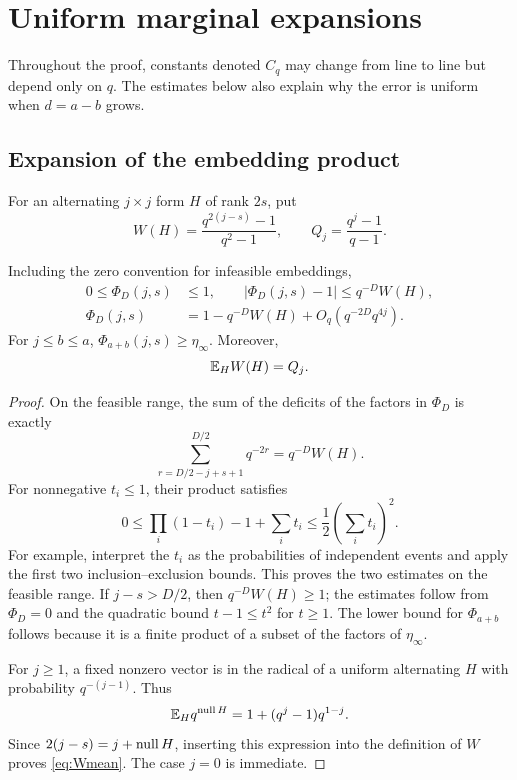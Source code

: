 \section{Uniform marginal expansions}\label{sec:marginal-proof}

Throughout the proof, constants denoted \(C_q\) may change from line to
line but depend only on \(q\). The estimates below also explain why
the error is uniform when \(d=a-b\) grows.

\subsection{Expansion of the embedding product}

For an alternating \(j\times j\) form \(H\) of rank \(2s\), put
\[
 W(H)=\frac{q^{2(j-s)}-1}{q^2-1},
 \qquad Q_j=\frac{q^j-1}{q-1}.
\]

\begin{lemma}\label{lem:products}
Including the zero convention for infeasible embeddings,
\begin{align}
 0\le\Phi_D(j,s)&\le1,\qquad
 |\Phi_D(j,s)-1|\le q^{-D}W(H),\label{eq:product-first}\\
 \Phi_D(j,s)
   &=1-q^{-D}W(H)+O_q(q^{-2D}q^{4j}).\label{eq:product-second}
\end{align}
For \(j\le b\le a\), \(\Phi_{a+b}(j,s)\ge\eta_\infty\).
Moreover,
\begin{equation}\label{eq:Wmean}
 \mathbb E_HW(H)=Q_j.
\end{equation}
\end{lemma}

\begin{proof}
On the feasible range, the sum of the deficits of the factors in
\(\Phi_D\) is exactly
\[
 \sum_{r=D/2-j+s+1}^{D/2}q^{-2r}=q^{-D}W(H).
\]
For nonnegative \(t_i\le1\), their product satisfies
\[
 0\le \prod_i(1-t_i)-1+\sum_i t_i
       \le\frac12\left(\sum_i t_i\right)^2.
\]
For example, interpret the \(t_i\) as the probabilities of independent
events and apply the first two inclusion--exclusion bounds.
This proves the two estimates on the feasible range.
If \(j-s>D/2\), then \(q^{-D}W(H)\ge1\);
the estimates follow from \(\Phi_D=0\) and the quadratic bound
\(t-1\le t^2\) for \(t\ge1\).
The lower bound for \(\Phi_{a+b}\) follows because it is a finite
product of a subset of the factors of \(\eta_\infty\).

For \(j\ge1\), a fixed nonzero vector is in the radical of a uniform
alternating \(H\) with probability \(q^{-(j-1)}\).
Thus
\[
 \mathbb E_H q^{\operatorname{null} H}=1+(q^j-1)q^{1-j}.
\]
Since \(2(j-s)=j+\operatorname{null} H\), inserting this expression into the
definition of \(W\) proves \eqref{eq:Wmean}. The case \(j=0\) is
immediate.
\end{proof}

